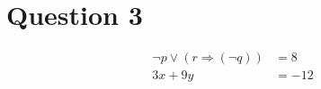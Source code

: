 \section*{Question 3}
\begin{align*} 
	\neg p \vee  (r \Rightarrow (\neg q)) &=  8 \\ 
	3x + 9y &=  -12
\end{align*}
